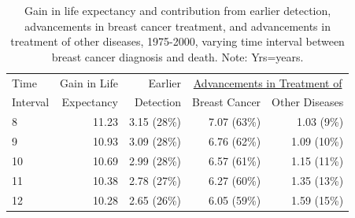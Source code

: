 \documentclass[11pt,letterpaper]{article}
\theoremstyle{plain}
\theoremstyle{remark}
\numberwithin{equation}{section}
\begin{document}
\begin{center}
  \begin{table}[h]
\begin{tabular}{@{}l rrrr@{}}
 Time & Gain in Life & Earlier & \multicolumn{2}{c}{\underline{Advancements in Treatment of}}\\
 Interval & Expectancy & Detection  & Breast Cancer   & Other Diseases  \\ 
  \midrule
  8  & 11.23 & 3.15 (28\%) & 7.07 (63\%) & 1.03 (9\%) \\ 
    9  & 10.93 & 3.09 (28\%) & 6.76 (62\%) & 1.09 (10\%) \\ 
   10  & 10.69 & 2.99 (28\%) & 6.57 (61\%) & 1.15 (11\%) \\ 
   11  & 10.38 & 2.78 (27\%) & 6.27 (60\%) & 1.35 (13\%) \\ 
   12  & 10.28 & 2.65 (26\%) & 6.05 (59\%) & 1.59 (15\%) \\ 
   \bottomrule
\end{tabular}
\caption{Gain in life expectancy and contribution from earlier
  detection, advancements in breast cancer treatment, and advancements
  in treatment of other diseases, 1975-2000, varying time interval between breast
  cancer diagnosis and death.  Note: Yrs=years.}
\end{table}
\end{center}

\newpage
{} 

\end{document}
